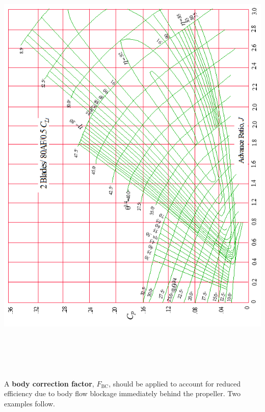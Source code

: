 \documentclass[
]{book}
\begin{document}
\includegraphics[width=6.62431in,height=8.31181in]{media/11/image24.png}

A \textbf{body correction factor}, \(F_{\mathrm{BC}}\), should be applied to account for reduced efficiency due to body flow blockage immediately behind the propeller. Two examples follow.
\end{document}
